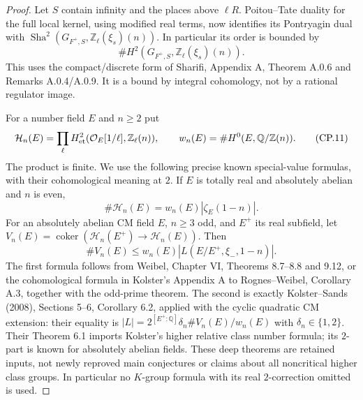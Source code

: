 \begin{proof}
Let $S$ contain infinity and the places above $\ell R$.
Poitou--Tate duality for the full local kernel, using modified
real terms, now identifies its Pontryagin dual with
$\operatorname{Sha}^2(G_{F^+,S},\mathbb Z_\ell(\xi_s)(n))$.
In particular its order is bounded by
\[
             \#H^2(G_{F^+,S},\mathbb Z_\ell(\xi_s)(n)).          \tag{CP.10}
\]
This uses the compact/discrete form of Sharifi, Appendix A,
Theorem A.0.6 and Remarks A.0.4/A.0.9.  It is a bound by
integral cohomology, not by a rational regulator image.

For a number field $E$ and $n\geq2$ put
\[
 \mathcal H_n(E)=\prod_\ell H^2_{\rm et}
                   (\mathcal O_E[1/\ell],\mathbb Z_\ell(n)),
 \qquad w_n(E)=\#H^0(E,\mathbb Q/\mathbb Z(n)).                   \tag{CP.11}
\]
The product is finite.  We use the following precise known
special-value formulas, with their cohomological meaning at $2$.
If $E$ is totally real and absolutely abelian and $n$ is even,
\[
                    \#\mathcal H_n(E)
                       =w_n(E)|\zeta_E(1-n)|.                   \tag{CP.12}
\]
For an absolutely abelian CM field $E$, $n\geq3$ odd, and
$E^+$ its real subfield, let
$V_n(E)=\operatorname{coker}(\mathcal H_n(E^+)\to\mathcal H_n(E))$.
Then
\[
              \#V_n(E)\leq
                w_n(E)|L(E/E^+,\xi_-,1-n)|.                     \tag{CP.13}
\]
The first formula follows from Weibel, Chapter VI,
Theorems 8.7--8.8 and 9.12, or the cohomological formula in
Kolster's Appendix A to Rognes--Weibel, Corollary A.3, together
with the odd-prime theorem.  The second is exactly
Kolster--Sands (2008), Sections 5--6, Corollary 6.2, applied
with the cyclic quadratic CM extension: their equality is
$|L|=2^{[E^+:\mathbb Q]}\delta_n\#V_n(E)/w_n(E)$ with
$\delta_n\in\{1,2\}$.  Their Theorem 6.1 imports Kolster's
higher relative class number formula; its $2$-part is known
for absolutely abelian fields.  These deep theorems are retained
inputs, not newly reproved main conjectures or claims about
all noncritical higher class groups.  In particular no
$K$-group formula with its real $2$-correction omitted is used.


\end{proof}
